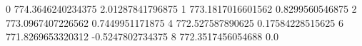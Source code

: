 0 774.3646240234375 2.01287841796875
1 773.1817016601562 0.8299560546875
2 773.0967407226562 0.7449951171875
4 772.527587890625 0.17584228515625
6 771.8269653320312 -0.5247802734375
8 772.3517456054688 0.0
